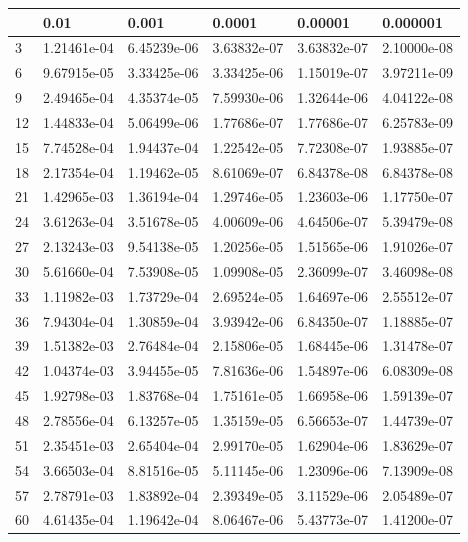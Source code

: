 \documentclass{article}
\begin{document}
\begin{table}[H]
\centering
\begin{tabular}{|l|l|l|l|l|l|}
\hline
& 0.01 & 0.001 & 0.0001 & 0.00001 & 0.000001 \\ \hline
3 & 1.21461e-04 & 6.45239e-06 & 3.63832e-07 & 3.63832e-07 & 2.10000e-08 \\ \hline
6 & 9.67915e-05 & 3.33425e-06 & 3.33425e-06 & 1.15019e-07 & 3.97211e-09 \\ \hline
9 & 2.49465e-04 & 4.35374e-05 & 7.59930e-06 & 1.32644e-06 & 4.04122e-08 \\ \hline
12 & 1.44833e-04 & 5.06499e-06 & 1.77686e-07 & 1.77686e-07 & 6.25783e-09 \\ \hline
15 & 7.74528e-04 & 1.94437e-04 & 1.22542e-05 & 7.72308e-07 & 1.93885e-07 \\ \hline
18 & 2.17354e-04 & 1.19462e-05 & 8.61069e-07 & 6.84378e-08 & 6.84378e-08 \\ \hline
21 & 1.42965e-03 & 1.36194e-04 & 1.29746e-05 & 1.23603e-06 & 1.17750e-07 \\ \hline
24 & 3.61263e-04 & 3.51678e-05 & 4.00609e-06 & 4.64506e-07 & 5.39479e-08 \\ \hline
27 & 2.13243e-03 & 9.54138e-05 & 1.20256e-05 & 1.51565e-06 & 1.91026e-07 \\ \hline
30 & 5.61660e-04 & 7.53908e-05 & 1.09908e-05 & 2.36099e-07 & 3.46098e-08 \\ \hline
33 & 1.11982e-03 & 1.73729e-04 & 2.69524e-05 & 1.64697e-06 & 2.55512e-07 \\ \hline
36 & 7.94304e-04 & 1.30859e-04 & 3.93942e-06 & 6.84350e-07 & 1.18885e-07 \\ \hline
39 & 1.51382e-03 & 2.76484e-04 & 2.15806e-05 & 1.68445e-06 & 1.31478e-07 \\ \hline
42 & 1.04374e-03 & 3.94455e-05 & 7.81636e-06 & 1.54897e-06 & 6.08309e-08 \\ \hline
45 & 1.92798e-03 & 1.83768e-04 & 1.75161e-05 & 1.66958e-06 & 1.59139e-07 \\ \hline
48 & 2.78556e-04 & 6.13257e-05 & 1.35159e-05 & 6.56653e-07 & 1.44739e-07 \\ \hline
51 & 2.35451e-03 & 2.65404e-04 & 2.99170e-05 & 1.62904e-06 & 1.83629e-07 \\ \hline
54 & 3.66503e-04 & 8.81516e-05 & 5.11145e-06 & 1.23096e-06 & 7.13909e-08 \\ \hline
57 & 2.78791e-03 & 1.83892e-04 & 2.39349e-05 & 3.11529e-06 & 2.05489e-07 \\ \hline
60 & 4.61435e-04 & 1.19642e-04 & 8.06467e-06 & 5.43773e-07 & 1.41200e-07 \\ \hline

\end{tabular}
\end{table}
\end{document}
